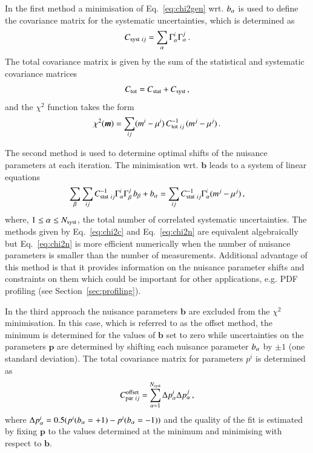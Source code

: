 \begin{description}
In the first method a minimisation of Eq.~\ref{eq:chi2gen} wrt. $b_\alpha$ is used to define the covariance
matrix for the systematic uncertainties, which is determined as
\begin{equation}
 C_{{\rm syst}~ij}= \sum_\alpha \Gamma^i_\alpha \Gamma^j_\alpha \,.
\end{equation}
The total covariance matrix is given by the sum of the statistical and
systematic covariance matrices
\begin{equation} 
C_{{\rm tot}} = C_{{\rm stat}} + C_{{\rm syst}}\,,
\end{equation}
and the $\chi^2$ function takes the form
\begin{equation} \label{eq:chi2c}
  \chi^2( \boldsymbol{m}) = \sum_{ij} ( m^i - \mu^i)\, C^{-1}_{{\rm tot}~ij} 
  \,( m^j - \mu^j)\,.
\end{equation}



The second method is used to determine optimal shifts of the nuisance
parameters at each iteration.
The minimisation wrt. $\boldsymbol{b}$ leads to a system of  linear equations 
\begin{equation} \label{eq:chi2n}
 \sum_\beta \sum_{ij} C^{-1}_{{\rm stat}~ij} \Gamma^i_\alpha \Gamma^j_\beta\, b_\beta + b_\alpha = \sum_{ij} C^{-1}_{{\rm stat}~ij} \Gamma^i_\alpha (m^j - \mu^j)\,,
\end{equation}
where, $1\le \alpha \le N_{\rm syst}$, the total number of correlated systematic uncertainties. The methods given by Eq.~\ref{eq:chi2c} and 
Eq.~\ref{eq:chi2n} are equivalent algebraically
but Eq.~\ref{eq:chi2n} is more efficient numerically
when the number of nuisance parameters is smaller than the number of measurements.
Additional advantage of this method is that it provides information on the nuisance parameter shifts and constraints on them 
which could be important for other applications, e.g. PDF profiling (see Section~\ref{sec:profiling}). 

In the third approach the nuisance parameters $\boldsymbol{b}$ are excluded from the $\chi^2$ minimisation.  
In this case, which is referred to as the offset method, the minimum is determined for the values of $\boldsymbol{b}$ set to zero
while uncertainties on the parameters $\boldsymbol{p}$ are determined by shifting each nuisance parameter $b_\alpha$
by $\pm 1$ (one standard deviation). The total covariance matrix for parameters $p^i$ is determined as 
\begin{equation}
  C^{\rm offset}_{ {\rm par}~ ij} = \sum_{\alpha=1}^{N_\mathrm{syst}} \Delta p^i_\alpha \Delta p^j_\alpha \,,
\end{equation}
where $ \Delta p^i_\alpha = 0.5 ( p^i( b_\alpha = +1 ) - p^i(b_\alpha = -1))$ and the quality of the fit is estimated by 
fixing $\boldsymbol{p}$ to the values determined at the minimum and minimising with respect to $\boldsymbol{b}$.


\end{description}
